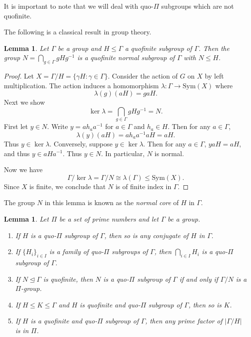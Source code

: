 \documentclass[10pt,a4paper]{amsart}
\newtheorem{lemma}[theorem]{Lemma}
\theoremstyle{definition}
\theoremstyle{definition}
\numberwithin{equation}{section}
\DeclareMathOperator{\Ker}{ker}
\begin{document}
It is important to note that we will deal with quo-$\Pi$ subgroups which are not quofinite.

The following is a classical result in group theory.

\begin{lemma}\label{lem:quofinitenormal} Let $\Gamma$ be a group and $H\leq \Gamma$ a quofinite subgroup of $\Gamma$. Then the group 
$N=\bigcap_{g\in \Gamma}gHg^{-1}$ is a quofinite normal subgroup of $\Gamma$ with $N\leq H$.
\end{lemma}

\begin{proof} Let $X=\Gamma/H=\{\gamma H\colon \gamma\in \Gamma\}$. Consider the action of $G$ on $X$ by left multiplication. The action induces a homomorphism $\lambda\colon \Gamma\to \mbox{Sym}(X)$ where 
$$\lambda(g)(aH)=gaH. $$
Next we show
$$ \Ker\lambda=\bigcap_{g\in \Gamma} gHg^{-1}=N. $$
First let $y\in N$. Write $y=ah_aa^{-1}$ for $a\in \Gamma$ and $h_a\in H$. Then for any $a\in \Gamma$, 
$$ \lambda(y)(aH)=ah_aa^{-1}aH=aH. $$
Thus $y\in \Ker\lambda$. Conversely, suppose $y\in \Ker\lambda$. Then for any $a\in \Gamma$, $yaH=aH$, and thus $y\in aHa^{-1}$. Thus $y\in N$. In particular, $N$ is normal.

Now we have
$$ \Gamma/\Ker\lambda=\Gamma/N\cong \lambda(\Gamma)\leq \mbox{Sym}(X). $$
Since $X$ is finite, we conclude that $N$ is of finite index in $\Gamma$.
\end{proof}

The group $N$ in this lemma is known as the {\em normal core} of $H$ in $\Gamma$.

\begin{lemma}\label{lem:quoPi} Let $\Pi$ be a set of prime numbers and let $\Gamma$ be a group. 
\begin{enumerate}
\item[(1)] If $H$ is a quo-$\Pi$ subgroup of $\Gamma$, then so is any conjugate of $H$ in $\Gamma$.
\item[(2)] If $\{H_i\}_{i\in I}$ is a family of quo-$\Pi$ subgroups of $\Gamma$, then $\bigcap_{i\in I}H_i$ is a quo-$\Pi$ subgroup of $\Gamma$.
\item[(3)] If $N\unlhd \Gamma$ is quofinite, then $N$ is a quo-$\Pi$ subgroup of $\Gamma$ if and only if $\Gamma/N$ is a $\Pi$-group.
\item[(4)] If $H\leq K\leq \Gamma$ and $H$ is quofinite and quo-$\Pi$ subgroup of $\Gamma$, then so is $K$.
\item[(5)] If $H$ is a quofinite and quo-$\Pi$ subgroup of $\Gamma$, then any prime factor of $|\Gamma/H|$ is in $\Pi$.
\end{enumerate}
\end{lemma}
\end{document}
